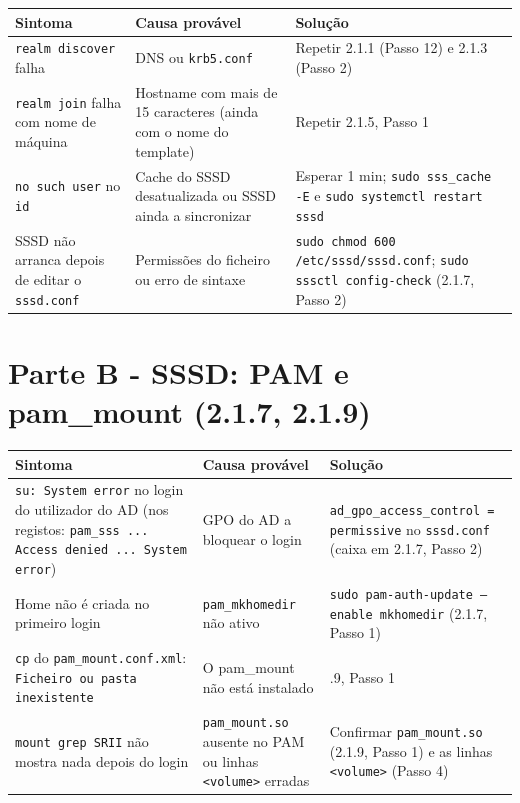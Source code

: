 \documentclass[11pt,a4paper,oneside]{report}
\begin{document}
\begin{center}\small
\begin{tabularx}{\linewidth}{|>{\raggedright\arraybackslash}X|>{\raggedright\arraybackslash}X|>{\raggedright\arraybackslash}X|}
\hline
\rowcolor{azul!10}\textbf{Sintoma} & \textbf{Causa provável} & \textbf{Solução} \\
\hline
\texttt{realm discover} falha & DNS ou \texttt{krb5.conf} & Repetir 2.1.1 (Passo 12) e 2.1.3 (Passo 2) \\
\hline
\texttt{realm join} falha com nome de máquina & Hostname com mais de 15 caracteres (ainda com o nome do template) & Repetir 2.1.5, Passo 1 \\
\hline
\texttt{no such user} no \texttt{id} & Cache do SSSD desatualizada ou SSSD ainda a sincronizar & Esperar 1 min; \texttt{sudo sss\_cache -E} e \texttt{sudo systemctl restart sssd} \\
\hline
SSSD não arranca depois de editar o \texttt{sssd.conf} & Permissões do ficheiro ou erro de sintaxe & \texttt{sudo chmod 600 /\allowbreak{}etc/\allowbreak{}sssd/\allowbreak{}sssd.conf}; \texttt{sudo sssctl config-check} (2.1.7, Passo 2) \\
\hline
\end{tabularx}
\end{center}

\label{ec-b1-pam}

\section*{Parte B - SSSD: PAM e pam\_mount (2.1.7, 2.1.9)}

\begin{center}\small
\begin{tabularx}{\linewidth}{|>{\raggedright\arraybackslash}X|>{\raggedright\arraybackslash}X|>{\raggedright\arraybackslash}X|}
\hline
\rowcolor{azul!10}\textbf{Sintoma} & \textbf{Causa provável} & \textbf{Solução} \\
\hline
\texttt{su: System error} no login do utilizador do AD (nos registos: \texttt{pam\_sss ... Access denied ... System error}) & GPO do AD a bloquear o login & \texttt{ad\_gpo\_access\_control = permissive} no \texttt{sssd.conf} (caixa em 2.1.7, Passo 2) \\
\hline
Home não é criada no primeiro login & \texttt{pam\_mkhomedir} não ativo & \texttt{sudo pam-auth-update --enable mkhomedir} (2.1.7, Passo 1) \\
\hline
\texttt{cp} do \texttt{pam\_mount.conf.xml}: \texttt{Ficheiro ou pasta inexistente} & O pam\_mount não está instalado & 2.1.9, Passo 1 \\
\hline
\texttt{mount \textbar{} grep SRII} não mostra nada depois do login & \texttt{pam\_mount.so} ausente no PAM ou linhas \texttt{\textless{}volume\textgreater{}} erradas & Confirmar \texttt{pam\_mount.so} (2.1.9, Passo 1) e as linhas \texttt{\textless{}volume\textgreater{}} (Passo 4) \\
\hline
\end{tabularx}
\end{center}
\end{document}
